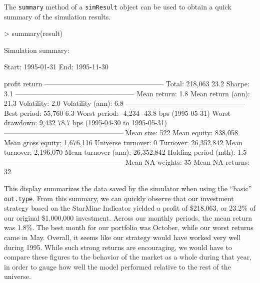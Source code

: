 \documentclass{article}
\begin{document}
The \texttt{summary} method of a \texttt{simResult} object can be used
to obtain a quick summary of the simulation results.

\begin{Schunk}
\begin{Sinput}
> summary(result)
\end{Sinput}
\begin{Soutput}
Simulation summary:


Start:   1995-01-31
End:     1995-11-30

                                    profit   return
---------------------------------------------------
Total:                             218,063     23.2 %  
Sharpe:                                         3.1
---------------------------------------------------
Mean return:                                    1.8 %  
Mean return (ann):                             21.3 %  
Volatility:                                     2.0 %  
Volatility (ann):                               6.8 %  
---------------------------------------------------
Best period:                        55,760      6.3 %   (1995-10-31)
Worst period:                       -4,234    -43.8 bps (1995-05-31)
Worst drawdown:                      9,432     78.7 bps (1995-04-30 to 1995-05-31)
---------------------------------------------------
Mean size:                             522
Mean equity:                       838,058
Mean gross equity:               1,676,116
Universe turnover:                       0
Turnover:                       26,352,842
Mean turnover:                   2,196,070
Mean turnover (ann):            26,352,842
Holding period (mth):                  1.5
---------------------------------------------------
Mean NA weights:                        35
Mean NA returns:                        32
\end{Soutput}
\end{Schunk}

This display summarizes the data saved by the simulator when using the
``basic'' \texttt{out.type}.  From this summary, we can quickly
observe that our investment strategy based on the StarMine Indicator
yielded a profit of \$218,063, or 23.2\% of our original \$1,000,000
investment.  Across our monthly periods, the mean return was 1.8\%.
The best month for our portfolio was October, while our worst returns
came in May.  Overall, it seems like our strategy would have worked
very well during 1995.  While such strong returns are encouraging, we
would have to compare these figures to the behavior of the market as a
whole during that year, in order to gauge how well the model performed
relative to the rest of the universe.
\end{document}
